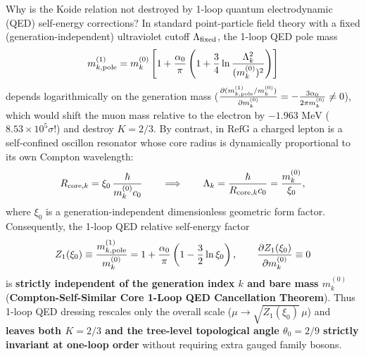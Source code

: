\documentclass[11pt,a4paper]{article}
\newcommand{\RefG}{\mathrm{RefG}}
\begin{document}
Why is the Koide relation not destroyed by 1-loop quantum electrodynamic (QED) self-energy corrections? In standard point-particle field theory with a fixed (generation-independent) ultraviolet cutoff $\Lambda_{\rm fixed}$, the 1-loop QED pole mass
\begin{equation}
m_{k,{\rm pole}}^{(1)} = m_k^{(0)}\left[1 + \frac{\alpha_0}{\pi}\left(1 + \frac{3}{4}\ln\frac{\Lambda_k^2}{(m_k^{(0)})^2}\right)\right]
\end{equation}
depends logarithmically on the generation mass ($\frac{\partial(m_{k,{\rm pole}}^{(1)}/m_k^{(0)})}{\partial m_k^{(0)}} = -\frac{3\alpha_0}{2\pi m_k^{(0)}} \neq 0$), which would shift the muon mass relative to the electron by $-1.963\text{ MeV}$ ($8.53\times 10^5\sigma$!) and destroy $K=2/3$. By contrast, in $\RefG$ a charged lepton is a self-confined oscillon resonator whose core radius is dynamically proportional to its own Compton wavelength:
\begin{equation}
R_{{\rm core},k} = \xi_0\,\frac{\hbar}{m_k^{(0)} c_0} \qquad \Longrightarrow \qquad \Lambda_k = \frac{\hbar}{R_{{\rm core},k} c_0} = \frac{m_k^{(0)}}{\xi_0},
\end{equation}
where $\xi_0$ is a generation-independent dimensionless geometric form factor. Consequently, the 1-loop QED relative self-energy factor
\begin{equation}
Z_1(\xi_0) \equiv \frac{m_{k,{\rm pole}}^{(1)}}{m_k^{(0)}} = 1 + \frac{\alpha_0}{\pi}\left(1 - \frac{3}{2}\ln\xi_0\right), \qquad \frac{\partial Z_1(\xi_0)}{\partial m_k^{(0)}} \equiv 0
\end{equation}
is \textbf{strictly independent of the generation index $k$ and bare mass $m_k^{(0)}$} (\textbf{Compton-Self-Similar Core 1-Loop QED Cancellation Theorem}). Thus 1-loop QED dressing rescales only the overall scale ($\mu \to \sqrt{Z_1(\xi_0)}\,\mu$) and \textbf{leaves both $K = 2/3$ and the tree-level topological angle $\theta_0 = 2/9$ strictly invariant at one-loop order} without requiring extra gauged family bosons.
\end{document}
